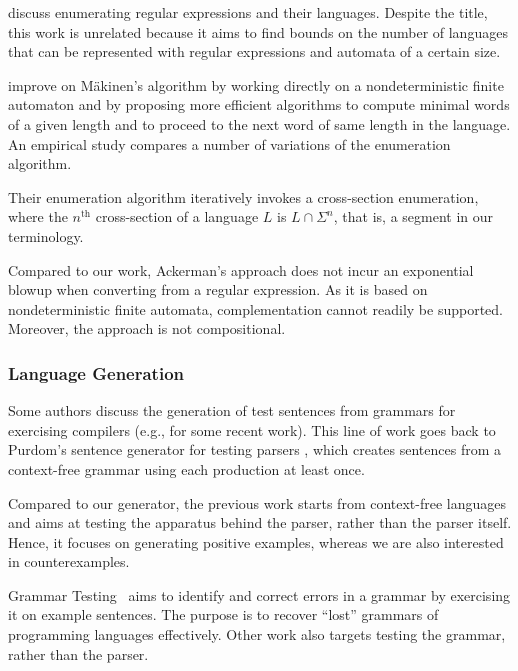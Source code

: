 \citet{DBLP:conf/wia/LeeS04} discuss enumerating regular expressions
and their languages. Despite the title, this work is unrelated
because it aims to find bounds on the number of languages that can be
represented with regular expressions and automata of a certain size.

\citet{DBLP:journals/tcs/AckermanS09} improve on M{\"{a}}kinen's
algorithm by working directly on a nondeterministic finite automaton
and by proposing more efficient algorithms to compute minimal words of
a given length and to proceed to the next word of same length in the
language. An empirical study compares a number of variations of the
enumeration algorithm.

Their enumeration algorithm iteratively invokes a cross-section
enumeration, where the $n^{\text{th}}$ cross-section of a language $L$ is
$L \cap \Sigma^n$, that is, a segment in our terminology.

Compared to our work, Ackerman's approach does not incur an
exponential blowup when converting from a regular expression. As it is based on
nondeterministic finite automata, complementation cannot readily be
supported. Moreover, the approach is not compositional.



\subsubsection*{Language Generation}
Some authors discuss the generation of test sentences from grammars for
exercising compilers
(e.g., \cite{DBLP:conf/cisse/ParachaF08,DBLP:conf/compsac/ZhengW09}
for some recent work). This
line of work goes back to Purdom's sentence generator for testing
parsers \cite{purdom72:_senten_gener_testin_parser}, which creates
sentences from a context-free grammar using each production at least
once.

Compared to our generator, the previous work starts from context-free
languages and aims at testing the apparatus behind the parser,
rather than the parser itself. Hence, it focuses on generating
positive examples, whereas we are also interested in counterexamples.

Grammar Testing~\cite{DBLP:conf/fase/Lammel01} aims to
identify and correct errors in a grammar by exercising it on example
sentences. The purpose is to recover ``lost'' grammars of programming
languages effectively.
Other work \cite{DBLP:conf/compsac/LiJLG04} also targets
testing the grammar, rather than the parser.

